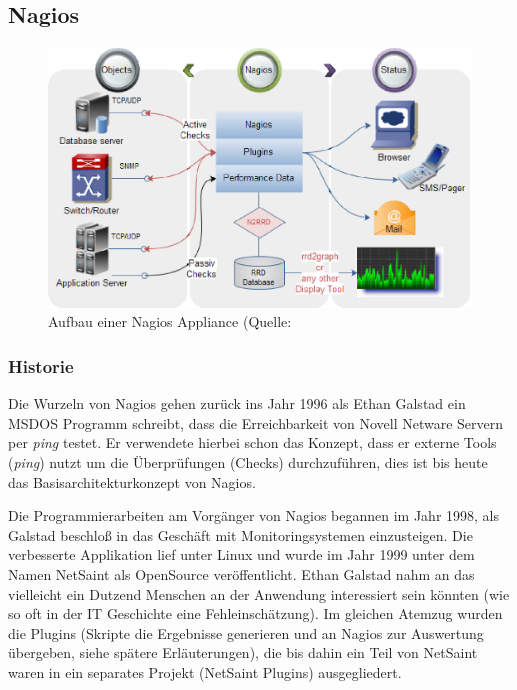 \documentclass[12pt,a4paper,parskip,listof=totoc,bibliography=totoc]{scrreprt}
\begin{document}
	\subsection{Nagios}
	\begin{figure}[!h]
	\centering
	\includegraphics[width=1\textwidth]{pics/NagiosMonitoring.eps}
    \caption[Grober Aufbau von Nagios]{Aufbau einer Nagios Appliance (Quelle: \textcite{nagiosaufbau}}
    \label{fig:nagiosaufbau}
	\end{figure}
	\clearpage
	\subsubsection{Historie}
	Die Wurzeln von Nagios gehen zurück ins Jahr 1996 als Ethan Galstad ein MSDOS Programm schreibt, dass die Erreichbarkeit von Novell Netware Servern per \textit{ping} testet. Er verwendete hierbei schon das Konzept, dass er externe Tools (\textit{ping}) nutzt um die Überprüfungen (\glqq Checks\grqq) durchzuführen, dies ist bis heute das Basisarchitekturkonzept von Nagios.
	
	Die Programmierarbeiten am Vorgänger von Nagios begannen im Jahr 1998, als Galstad beschloß in das Geschäft mit Monitoringsystemen einzusteigen. Die verbesserte Applikation lief unter Linux und wurde im Jahr 1999 unter dem Namen NetSaint als OpenSource veröffentlicht. Ethan Galstad nahm an das vielleicht ein Dutzend Menschen an der Anwendung interessiert sein könnten (wie so oft in der IT Geschichte eine Fehleinschätzung). Im gleichen Atemzug wurden die Plugins (Skripte die Ergebnisse generieren und an Nagios zur Auswertung übergeben, siehe spätere Erläuterungen), die bis dahin ein Teil von NetSaint waren in ein separates Projekt (NetSaint Plugins) ausgegliedert.
	
\end{document}
